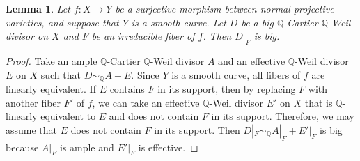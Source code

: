 \documentclass[12pt]{amsart}
\newcommand{\Q}{\mathbb{Q}}
\theoremstyle{plain}
\newtheorem{lem}[thm]{Lemma}
\theoremstyle{definition}
\theoremstyle{remark}
\newtheorem{defn and notation}[thm]{Definition and Notation}
\theoremstyle{plain}
\begin{document}
\begin{lem}\label{lem:restriction}
    Let $f\colon X\to Y$ be a surjective morphism between normal projective varieties, and suppose that $Y$ is a smooth curve.
    Let $D$ be a big $\Q$-Cartier $\Q$-Weil divisor on $X$ and $F$ be an irreducible fiber of $f$. 
   Then $D|_F$ is big.
\end{lem}
\begin{proof}
    Take an ample $\Q$-Cartier $\Q$-Weil divisor $A$ and an effective $\Q$-Weil divisor $E$ on $X$ such that $D\sim_{\Q} A+E$.
    Since $Y$ is a smooth curve, all fibers of $f$ are linearly equivalent.  
    If $E$ contains $F$ in its support, then by replacing $F$ with another fiber $F'$ of $f$, we can take an effective $\Q$-Weil divisor $E'$ on $X$ that is $\Q$-linearly equivalent to $E$ and does not contain $F$ in its support. 
    Therefore, we may assume that $E$ does not contain $F$ in its support. 
    Then $D|_F\sim_{\Q} A|_F+E'|_F$ is big because $A|_F$ is ample and $E'|_F$ is effective.
\end{proof}
\end{document}
